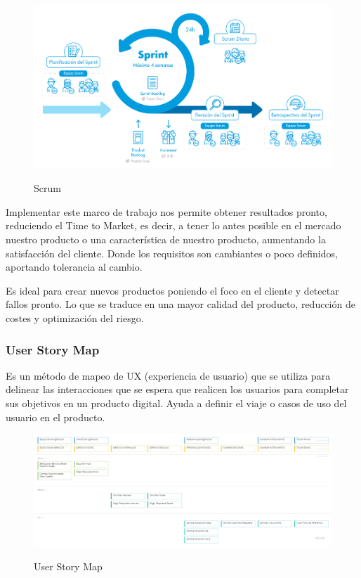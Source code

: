 \documentclass[12pt,twoside,titlepage]{report}
\begin{document}
\begin{figure}[H]
    \centering
    \includegraphics[scale=0.39]{Scrum}
    \label{fig:Scrum}
    \caption{Scrum}
\end{figure}

Implementar este marco de trabajo nos permite obtener resultados pronto, reduciendo el Time to Market, es decir, a tener lo antes posible en el mercado nuestro producto o una característica de nuestro producto, aumentando la satisfacción del cliente. Donde los requisitos son cambiantes o poco definidos, aportando tolerancia al cambio.

Es ideal para crear nuevos productos poniendo el foco en el cliente y detectar fallos pronto. Lo que se traduce en una mayor calidad del producto, reducción de costes y optimización del riesgo.

\subsubsection{User Story Map}

Es un método de mapeo de UX (experiencia de usuario) que se utiliza para delinear las interacciones que se espera que realicen los usuarios para completar sus objetivos en un producto digital. Ayuda a definir el viaje o casos de uso del usuario en el producto.

\begin{figure}[H]
    \centering
    \includegraphics[scale=0.25]{USERSTORYMAP}
    \label{fig:UserStoryMap}
    \caption{User Story Map}
\end{figure}
\end{document}
